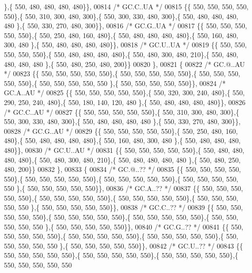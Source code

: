 \begin{DoxyCode}
      \},\{ 550, 480, 480, 480, 480\}\},
00814 \textcolor{comment}{/* GC.C..UA */}
00815 \{\{ 550, 550, 550, 550, 550\},\{ 550, 310, 300, 480, 300\},\{ 550, 300, 330, 480, 300\},\{ 550, 480, 480, 480, 480
      \},\{ 550, 330, 270, 480, 300\}\},
00816 \textcolor{comment}{/* GC.G..UA */}
00817 \{\{ 550, 550, 550, 550, 550\},\{ 550, 250, 480, 160, 480\},\{ 550, 480, 480, 480, 480\},\{ 550, 160, 480, 300, 480
      \},\{ 550, 480, 480, 480, 480\}\},
00818 \textcolor{comment}{/* GC.U..UA */}
00819 \{\{ 550, 550, 550, 550, 550\},\{ 550, 480, 480, 480, 480\},\{ 550, 480, 300, 480, 210\},\{ 550, 480, 480, 480, 480
      \},\{ 550, 480, 250, 480, 200\}\}
00820 \},
00821 \{
00822 \textcolor{comment}{/* GC.@..AU */}
00823 \{\{ 550, 550, 550, 550, 550\},\{ 550, 550, 550, 550, 550\},\{ 550, 550, 550, 550, 550\},\{ 550, 550, 550, 550, 550
      \},\{ 550, 550, 550, 550, 550\}\},
00824 \textcolor{comment}{/* GC.A..AU */}
00825 \{\{ 550, 550, 550, 550, 550\},\{ 550, 320, 300, 240, 480\},\{ 550, 290, 250, 240, 480\},\{ 550, 180, 140, 120, 480
      \},\{ 550, 480, 480, 480, 480\}\},
00826 \textcolor{comment}{/* GC.C..AU */}
00827 \{\{ 550, 550, 550, 550, 550\},\{ 550, 310, 300, 480, 300\},\{ 550, 300, 330, 480, 300\},\{ 550, 480, 480, 480, 480
      \},\{ 550, 330, 270, 480, 300\}\},
00828 \textcolor{comment}{/* GC.G..AU */}
00829 \{\{ 550, 550, 550, 550, 550\},\{ 550, 250, 480, 160, 480\},\{ 550, 480, 480, 480, 480\},\{ 550, 160, 480, 300, 480
      \},\{ 550, 480, 480, 480, 480\}\},
00830 \textcolor{comment}{/* GC.U..AU */}
00831 \{\{ 550, 550, 550, 550, 550\},\{ 550, 480, 480, 480, 480\},\{ 550, 480, 300, 480, 210\},\{ 550, 480, 480, 480, 480
      \},\{ 550, 480, 250, 480, 200\}\}
00832 \},
00833 \{
00834 \textcolor{comment}{/* GC.@..?? */}
00835 \{\{ 550, 550, 550, 550, 550\},\{ 550, 550, 550, 550, 550\},\{ 550, 550, 550, 550, 550\},\{ 550, 550, 550, 550, 550
      \},\{ 550, 550, 550, 550, 550\}\},
00836 \textcolor{comment}{/* GC.A..?? */}
00837 \{\{ 550, 550, 550, 550, 550\},\{ 550, 550, 550, 550, 550\},\{ 550, 550, 550, 550, 550\},\{ 550, 550, 550, 550, 550
      \},\{ 550, 550, 550, 550, 550\}\},
00838 \textcolor{comment}{/* GC.C..?? */}
00839 \{\{ 550, 550, 550, 550, 550\},\{ 550, 550, 550, 550, 550\},\{ 550, 550, 550, 550, 550\},\{ 550, 550, 550, 550, 550
      \},\{ 550, 550, 550, 550, 550\}\},
00840 \textcolor{comment}{/* GC.G..?? */}
00841 \{\{ 550, 550, 550, 550, 550\},\{ 550, 550, 550, 550, 550\},\{ 550, 550, 550, 550, 550\},\{ 550, 550, 550, 550, 550
      \},\{ 550, 550, 550, 550, 550\}\},
00842 \textcolor{comment}{/* GC.U..?? */}
00843 \{\{ 550, 550, 550, 550, 550\},\{ 550, 550, 550, 550, 550\},\{ 550, 550, 550, 550, 550\},\{ 550, 550, 550, 550, 550

\end{DoxyCode}
